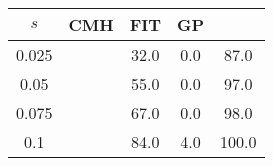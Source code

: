 \centering \begin{tabular}{c|c|c|c|c}
$s$	&CMH	&FIT	&GP	&\sc{Clear}\\\hline
0.025	&	&32.0	&0.0	&87.0\\
0.05	&	&55.0	&0.0	&97.0\\
0.075	&	&67.0	&0.0	&98.0\\
0.1	&	&84.0	&4.0	&100.0\\
\end{tabular}
